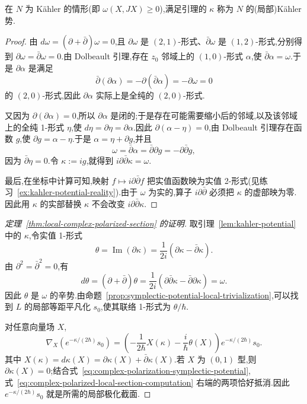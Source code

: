 在 $N$ 为 Kähler 的情形(即 $\omega(X,JX)\ge0$),满足引理的 $\kappa$ 称为 $N$ 的(局部)Kähler 势.

\begin{proof}
由 $d\omega=(\partial+\bar\partial)\omega=0$,且 $\partial\omega$ 是 $(2,1)$-形式、$\bar\partial\omega$ 是 $(1,2)$-形式,分别得到 $\partial\omega=\bar\partial\omega=0$.由 Dolbeault 引理,存在 $z_0$ 邻域上的 $(1,0)$-形式 $\alpha$,使 $\bar\partial\alpha=\omega$.于是 $\partial\alpha$ 是满足
\[
 \bar\partial(\partial\alpha)=-\partial(\bar\partial\alpha)=-\partial\omega=0
\]
的 $(2,0)$-形式,因此 $\partial\alpha$ 实际上是全纯的 $(2,0)$-形式.

又因为 $\partial(\partial\alpha)=0$,所以 $\partial\alpha$ 是闭的;于是存在可能需要缩小后的邻域,以及该邻域上的全纯 1-形式 $\eta$,使 $d\eta=\partial\eta=\partial\alpha$.因此 $\partial(\alpha-\eta)=0$,由 Dolbeault 引理存在函数 $g$,使 $\partial g=\alpha-\eta$.于是 $\alpha=\eta+\partial g$,并且
\[
 \omega=\bar\partial\alpha=\bar\partial\partial g=-\partial\bar\partial g,
\]
因为 $\bar\partial\eta=0$.令 $\kappa:=ig$,就得到 $i\partial\bar\partial\kappa=\omega$.

最后,在坐标中计算可知,映射 $f\mapsto i\partial\bar\partial f$ 把实值函数映为实值 2-形式(见练习~\ref{ex:kahler-potential-reality}).由于 $\omega$ 为实的,算子 $i\partial\bar\partial$ 必须把 $\kappa$ 的虚部映为零.因此用 $\kappa$ 的实部替换 $\kappa$ 不会改变 $i\partial\bar\partial\kappa$.
\end{proof}

\begin{proof}[定理~\ref{thm:local-complex-polarized-section} 的证明]
取引理~\ref{lem:kahler-potential} 中的 $\kappa$,令实值 1-形式
\[
 \theta=\operatorname{Im}(\partial\kappa)
 =\frac{1}{2i}(\partial\kappa-\bar\partial\kappa).
 \label{eq:complex-polarization-symplectic-potential}
\]
由 $\partial^2=\bar\partial^2=0$,有
\[
 d\theta=(\partial+\bar\partial)\theta
 =\frac{1}{2i}(\partial\bar\partial\kappa-\bar\partial\partial\kappa)
 =\omega.
\]
因此 $\theta$ 是 $\omega$ 的辛势.由命题~\ref{prop:symplectic-potential-local-trivialization},可以找到 $L$ 的局部等距平凡化 $s_0$,使其联络 1-形式为 $\theta/\hbar$.

对任意向量场 $X$,
\[
 \nabla_X\left(e^{-\kappa/(2\hbar)}s_0\right)
 =\left(-\frac{1}{2\hbar}X(\kappa)-\frac{i}{\hbar}\theta(X)\right)e^{-\kappa/(2\hbar)}s_0.
 \label{eq:complex-polarized-local-section-computation}
\]
其中 $X(\kappa)=d\kappa(X)=\partial\kappa(X)+\bar\partial\kappa(X)$.若 $X$ 为 $(0,1)$ 型,则 $\partial\kappa(X)=0$;结合式~\eqref{eq:complex-polarization-symplectic-potential},式~\eqref{eq:complex-polarized-local-section-computation} 右端的两项恰好抵消.因此 $e^{-\kappa/(2\hbar)}s_0$ 就是所需的局部极化截面.
\end{proof}

